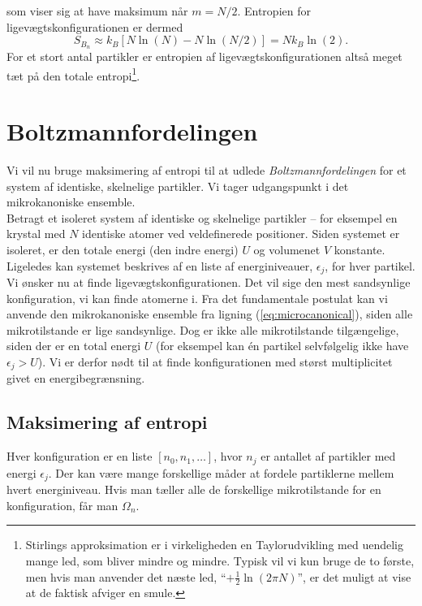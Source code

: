 som viser sig at have maksimum når $m=N/2$. Entropien for ligevægtskonfigurationen er dermed
\[ S_{B_n}\approx k_B\left[N\ln (N)-N\ln (N/2)\right]=Nk_B\ln (2). \]
For et stort antal partikler er entropien af ligevægtskonfigurationen altså meget tæt på den totale entropi\footnote{Stirlings approksimation er i virkeligheden en Taylorudvikling med uendelig mange led, som bliver mindre og mindre. Typisk vil vi kun bruge de to første, men hvis man anvender det næste led, ``$+\frac{1}{2}\ln(2\pi N)$'', er det muligt at vise at de faktisk afviger en smule.}. %

\section{Boltzmannfordelingen}
Vi vil nu bruge maksimering af entropi til at udlede \emph{Boltzmannfordelingen} for et system af identiske, skelnelige partikler. Vi tager udgangspunkt i det mikrokanoniske ensemble.\\
\indent Betragt et isoleret system af identiske og skelnelige partikler -- for eksempel en krystal med $N$ identiske atomer ved veldefinerede positioner. Siden systemet er isoleret, er den totale energi (den indre energi) $U$ og volumenet $V$ konstante. Ligeledes kan systemet beskrives af en liste af energiniveauer, $\epsilon_j$, for hver partikel. Vi ønsker nu at finde ligevægtskonfigurationen. Det vil sige den mest sandsynlige konfiguration, vi kan finde atomerne i. Fra det fundamentale postulat kan vi anvende den mikrokanoniske ensemble fra ligning (\ref{eq:microcanonical}), siden alle mikrotilstande er lige sandsynlige. Dog er ikke alle mikrotilstande tilgængelige, siden der er en total energi $U$ (for eksempel kan én partikel selvfølgelig ikke have $\epsilon_j>U$). Vi er derfor nødt til at finde konfigurationen med størst multiplicitet givet en energibegrænsning.
\subsection{Maksimering af entropi}
Hver konfiguration er en liste $[n_0,n_1,\dots]$, hvor $n_j$ er antallet af partikler med energi $\epsilon_j$. Der kan være mange forskellige måder at fordele partiklerne mellem hvert energiniveau. Hvis man tæller alle de forskellige mikrotilstande for en konfiguration, får man $\Omega_n$.
